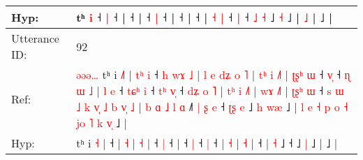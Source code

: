 \documentclass[10pt]{article}
\DeclareRobustCommand{\hl}[1]{{\textcolor{red}{#1}}}
\begin{document}
\begin{longtable}{ll}
 \\
Hyp: & \hl{}\hl{}\hl{}\hl{}\hl{}\hl{}\hl{}\hl{}\hl{}\hl{}\hl{}\hl{}\hl{}\hl{}\hl{}\hl{}tʰ \hl{}\hl{i} ˧ \hl{}\hl{|} ˧ |\hl{}\hl{}\hl{}\hl{} ˧ |\hl{}\hl{}\hl{}\hl{} ˧\hl{}\hl{}\hl{} \hl{|} ˧\hl{}\hl{}\hl{}\hl{}\hl{} |\hl{}\hl{}\hl{}\hl{}\hl{} ˧\hl{}\hl{}\hl{}\hl{}\hl{}\hl{}\hl{}\hl{}\hl{}\hl{}\hl{}\hl{}\hl{}\hl{}\hl{}\hl{}\hl{}\hl{}\hl{}\hl{}\hl{}\hl{}\hl{} |\hl{}\hl{}\hl{}\hl{} ˧ | \hl{˧} \hl{|} ˧\hl{}\hl{}\hl{}\hl{} \hl{|} ˧ \hl{˩} \hl{˧} ˩ \hl{}\hl{˧} ˩ |\hl{}\hl{}\hl{}\hl{} \hl{˩} |\hl{}\hl{}\hl{}\hl{}\hl{}\hl{}\hl{}\hl{}\hl{}\hl{}\hl{}\hl{} ˩ |
 \\
\midrule
Utterance ID: & 92 \\
Ref: & \hl{ə}\hl{ə}\hl{ə}\hl{…}\hl{ }tʰ i \hl{˩}\hl{˥} |\hl{ }\hl{t}\hl{ʰ}\hl{ }\hl{i} ˧\hl{ }\hl{h}\hl{ }\hl{w}\hl{ɤ}\hl{ }\hl{˩} |\hl{ }\hl{l}\hl{ }\hl{e}\hl{ }\hl{d}\hl{ʑ}\hl{ }\hl{o} \hl{˥} |\hl{ }\hl{t}\hl{ʰ}\hl{ }\hl{i} \hl{˩}\hl{˥} |\hl{ }\hl{ʈ}\hl{ʂ}\hl{ʰ}\hl{ }\hl{ɯ} ˧ \hl{v}\hl{̩} ˧\hl{ }\hl{ɳ}\hl{ }\hl{ɯ}\hl{ }\hl{˩} |\hl{ }\hl{l}\hl{ }\hl{e} ˧\hl{ }\hl{t}\hl{ɕ}\hl{ʰ} \hl{i} ˧\hl{ }\hl{t}\hl{ʰ} \hl{v}\hl{̩} ˧\hl{ }\hl{d}\hl{ʑ}\hl{ }\hl{o}\hl{ }\hl{˥} |\hl{ }\hl{t}\hl{ʰ}\hl{ }\hl{i} \hl{˩}\hl{˥} |\hl{ }\hl{w}\hl{ɤ} \hl{˩}\hl{˥} |\hl{ }\hl{ʈ}\hl{ʂ}\hl{ʰ}\hl{ }\hl{ɯ} ˧\hl{ }\hl{s}\hl{ }\hl{ɯ}\hl{ }\hl{˩}\hl{ }\hl{k}\hl{ }\hl{v}\hl{̩}\hl{ }\hl{˩}\hl{ }\hl{b}\hl{ }\hl{v}\hl{̩}\hl{ }\hl{˩} |\hl{ }\hl{b}\hl{ }\hl{ɑ}\hl{ }\hl{˩}\hl{ }\hl{l} \hl{ɑ} ˩\hl{˥}\hl{ }\hl{|}\hl{ }\hl{ʂ}\hl{ }\hl{e} ˧\hl{ }\hl{ʈ}\hl{ʂ}\hl{ }\hl{e} ˩\hl{ }\hl{h} \hl{w}\hl{æ} ˩ |\hl{ }\hl{l}\hl{ }\hl{e}\hl{ }\hl{˧}\hl{ }\hl{p}\hl{ }\hl{o}\hl{ }\hl{˧}\hl{ }\hl{j}\hl{o}\hl{ }\hl{˥}\hl{ }\hl{k}\hl{ }\hl{v}\hl{̩} ˩ |
 \\
Hyp: & \hl{}\hl{}\hl{}\hl{}\hl{}tʰ i \hl{}\hl{˧} |\hl{}\hl{}\hl{}\hl{}\hl{} ˧\hl{}\hl{}\hl{}\hl{}\hl{}\hl{}\hl{} |\hl{}\hl{}\hl{}\hl{}\hl{}\hl{}\hl{}\hl{}\hl{} \hl{˧} |\hl{}\hl{}\hl{}\hl{}\hl{} \hl{}\hl{˧} |\hl{}\hl{}\hl{}\hl{}\hl{}\hl{} ˧ \hl{}\hl{|} ˧\hl{}\hl{}\hl{}\hl{}\hl{}\hl{} |\hl{}\hl{}\hl{}\hl{} ˧\hl{}\hl{}\hl{}\hl{} \hl{|} ˧\hl{}\hl{}\hl{} \hl{}\hl{|} ˧\hl{}\hl{}\hl{}\hl{}\hl{}\hl{}\hl{} |\hl{}\hl{}\hl{}\hl{}\hl{} \hl{}\hl{˧} |\hl{}\hl{}\hl{} \hl{}\hl{˧} |\hl{}\hl{}\hl{}\hl{}\hl{}\hl{} ˧\hl{}\hl{}\hl{}\hl{}\hl{}\hl{}\hl{}\hl{}\hl{}\hl{}\hl{}\hl{}\hl{}\hl{}\hl{}\hl{}\hl{}\hl{}\hl{}\hl{} |\hl{}\hl{}\hl{}\hl{}\hl{}\hl{}\hl{}\hl{} \hl{˧} ˩\hl{}\hl{}\hl{}\hl{}\hl{}\hl{}\hl{} ˧\hl{}\hl{}\hl{}\hl{}\hl{} ˩\hl{}\hl{} \hl{}\hl{|} ˩ |\hl{}\hl{}\hl{}\hl{}\hl{}\hl{}\hl{}\hl{}\hl{}\hl{}\hl{}\hl{}\hl{}\hl{}\hl{}\hl{}\hl{}\hl{}\hl{}\hl{}\hl{}\hl{} ˩ |

\end{longtable}
\end{document}
